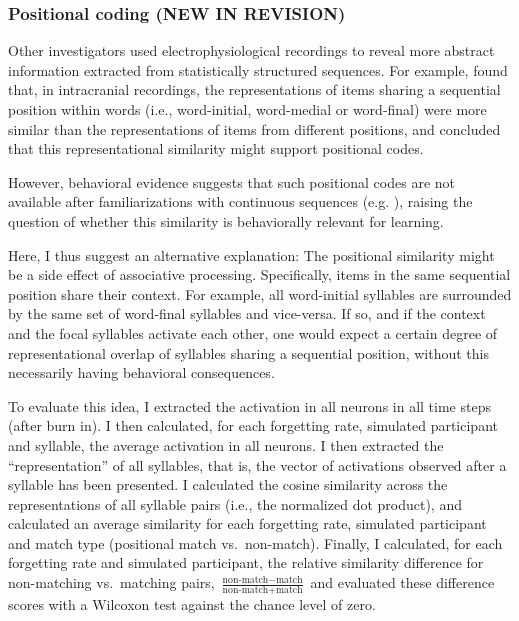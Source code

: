 \documentclass[
]{article}
\begin{document}
\clearpage

\hypertarget{positional-coding-new-in-revision}{%
\subsubsection{Positional coding (NEW IN
REVISION)}\label{positional-coding-new-in-revision}}

Other investigators used electrophysiological recordings to reveal more
abstract information extracted from statistically structured sequences.
For example, \citep{Henin2021} found that, in intracranial recordings,
the representations of items sharing a sequential position within words
(i.e., word-initial, word-medial or word-final) were more similar than
the representations of items from different positions, and concluded
that this representational similarity might support positional codes.

However, behavioral evidence suggests that such positional codes are not
available after familiarizations with continuous sequences (e.g.
\citep{Marchetto2013, Endress-AXC, Endress-AXC-Edge, Endress-AXC-Review, Pena2002}),
raising the question of whether this similarity is behaviorally relevant
for learning.

Here, I thus suggest an alternative explanation: The positional
similarity might be a side effect of associative processing.
Specifically, items in the same sequential position share their context.
For example, all word-initial syllables are surrounded by the same set
of word-final syllables and vice-versa. If so, and if the context and
the focal syllables activate each other, one would expect a certain
degree of representational overlap of syllables sharing a sequential
position, without this necessarily having behavioral consequences.

To evaluate this idea, I extracted the activation in all neurons in all
time steps (after burn in). I then calculated, for each forgetting rate,
simulated participant and syllable, the average activation in all
neurons. I then extracted the ``representation'' of all syllables, that
is, the vector of activations observed after a syllable has been
presented. I calculated the cosine similarity across the representations
of all syllable pairs (i.e., the normalized dot product), and calculated
an average similarity for each forgetting rate, simulated participant
and match type (positional match vs.~non-match). Finally, I calculated,
for each forgetting rate and simulated participant, the relative
similarity difference for non-matching vs.~matching pairs,
\(\frac{\text{non-match} - \text{match}}{\text{non-match} + \text{match}}\)
and evaluated these difference scores with a Wilcoxon test against the
chance level of zero.
\end{document}

